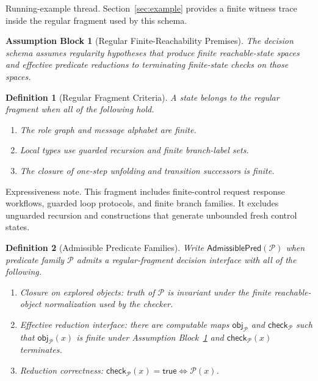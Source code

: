 \documentclass[a4paper,10pt,twocolumn,english]{article}
\numberwithin{equation}{section}
\theoremstyle{paperdef}
\newtheorem{definition}{Definition}[section]
\theoremstyle{paperplain}
\theoremstyle{paperdef}
\newtheorem{assumption}{Assumption Block}[section]
\theoremstyle{paperremark}
\begin{document}
Running-example thread. Section~\ref{sec:example} provides a finite witness
trace inside the regular fragment used by this schema.

\begin{assumption}[Regular Finite-Reachability Premises]
	\label{assump:p2-regular}
	The decision schema assumes regularity hypotheses that produce finite reachable-state spaces and effective predicate reductions to terminating finite-state checks on those spaces.
\end{assumption}

\begin{definition}[Regular Fragment Criteria]
	A state belongs to the regular fragment when all of the following hold.
	\begin{enumerate}
		\item The role graph and message alphabet are finite.
		\item Local types use guarded recursion and finite branch-label sets.
		\item The closure of one-step unfolding and transition successors is finite.
	\end{enumerate}
\end{definition}

Expressiveness note. This fragment includes finite-control request response workflows, guarded loop protocols, and finite branch families. It excludes unguarded recursion and constructions that generate unbounded fresh control states.

\begin{definition}[Admissible Predicate Families]
	\label{def:p2-admissible-family}
	Write $\mathsf{AdmissiblePred}(\mathcal{P})$ when predicate family $\mathcal{P}$
	admits a regular-fragment decision interface with all of the following.
	\begin{enumerate}
		\item Closure on explored objects: truth of $\mathcal{P}$ is invariant under the finite reachable-object normalization used by the checker.
		\item Effective reduction interface: there are computable maps
		      $\mathsf{obj}_{\mathcal{P}}$ and $\mathsf{check}_{\mathcal{P}}$ such that
		      $\mathsf{obj}_{\mathcal{P}}(x)$ is finite under Assumption
		      Block~\ref{assump:p2-regular} and $\mathsf{check}_{\mathcal{P}}(x)$
		      terminates.
		\item Reduction correctness:
		      $\mathsf{check}_{\mathcal{P}}(x)=\mathsf{true}\iff \mathcal{P}(x)$.
	\end{enumerate}
\end{definition}
\end{document}
